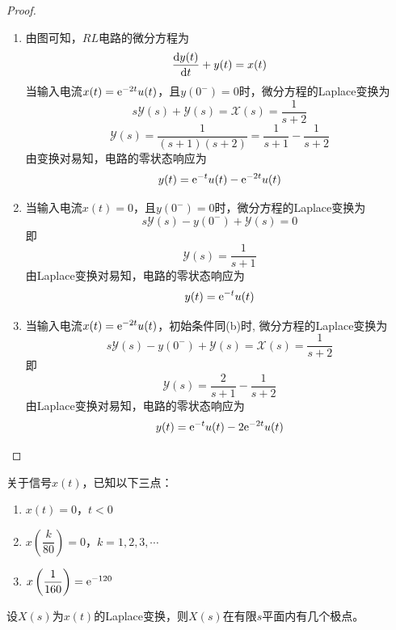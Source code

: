 \begin{proof}

    \begin{enumerate}

        \item 
            由图可知，$RL$电路的微分方程为
            \[\dfrac{\mathrm{d} y(t)}{\mathrm{d} t} + y(t) = x(t)\]
            当输入电流$x(t) = \mathrm{e}^{-2t}u(t)$，且$y(0^{-}) = 0$时，微分方程的\textup{Laplace}变换为
            \[s\mathscr{Y}(s) + \mathscr{Y}(s) = \mathscr{X}(s) = \dfrac{1}{s + 2}\]
            \[\mathscr{Y}(s) = \dfrac{1}{(s + 1)(s + 2)} = \dfrac{1}{s + 1} - \dfrac{1}{s + 2}\]
            由变换对易知，电路的零状态响应为
            \[y(t) = \mathrm{e}^{-t}u(t) - \mathrm{e}^{-2t}u(t)\]

        \item 
            当输入电流$x(t) = 0$，且$y(0^{-}) = 0$时，微分方程的\textup{Laplace}变换为
            \[s\mathscr{Y}(s) - y(0^{-}) + \mathscr{Y}(s) = 0\]
            即
            \[\mathscr{Y}(s) = \dfrac{1}{s + 1}\]
            由\textup{Laplace}变换对易知，电路的零状态响应为
            \[y(t) = \mathrm{e}^{-t}u(t)\]
        \item 
            当输入电流$x(t) =  \mathrm{e}^{-2t}u(t)$，初始条件同\textup{(b)}时,
            微分方程的\textup{Laplace}变换为
            \[s\mathscr{Y}(s) - y(0^{-}) + \mathscr{Y}(s) = \mathscr{X}(s) = \dfrac{1}{s + 2}\]
            即
            \[\mathscr{Y}(s) = \dfrac{2}{s + 1}  - \dfrac{1}{s + 2}\]
            由\textup{Laplace}变换对易知，电路的零状态响应为
            \[y(t) = \mathrm{e}^{-t}u(t) - 2\mathrm{e}^{-2t}u(t)\]
    \end{enumerate}

    
\end{proof}


\begin{proposition}
    
    关于信号$x(t)$，已知以下三点：
    
    \begin{enumerate}

        \item $x(t) = 0$，$t < 0$
        
        \item $x \left( \dfrac{k}{80} \right) = 0$，$k = 1, 2, 3, \cdots$
        
        \item $x \left( \dfrac{1}{160} \right) = \mathrm{e}^{-120}$
        
   \end{enumerate}

   设$X(s)$为$x(t)$的\textup{Laplace}变换，则$X(s)$在有限$s$平面内有几个极点。

\end{proposition}

